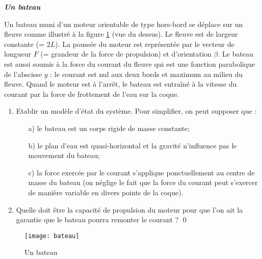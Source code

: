 \begin{exercice}{\bf \em Un bateau}

Un bateau muni d'un moteur orientable de type \og hors-bord \gf se déplace sur un fleuve comme illustré à la figure \ref{bateau} (vue du dessus). Le fleuve est de largeur constante (= 2$L$). La poussée du moteur est représentée par le vecteur de longueur $F$ (= grandeur de la force de propulsion) et d'orientation $\beta$. Le bateau est aussi soumis à la force du courant du fleuve qui est une fonction parabolique de l'abscisse $y$ : le courant est nul aux deux bords et maximum au milieu du fleuve. Quand le moteur est à l'arrêt, le bateau est entraîné à la vitesse du courant par la force de frottement de l'eau sur la coque. 
\begin{enumerate}
\item Etablir un modèle d'état du système. Pour simplifier, on peut supposer que :
\begin{itemize}
\item[a)] le bateau est un corps rigide de masse constante;
\item[b)] le plan d'eau est quasi-horizontal et la gravité n'influence pas le mouvement du bateau;
\item[c)] la force exercée par le courant s'applique ponctuellement au centre de masse du bateau (on néglige le fait que la force du courant peut s'exercer de manière variable en divers points de la coque).
\end{itemize}
\item Quelle doit être la capacité de propulsion du moteur pour que l'on ait la garantie que le bateau pourra remonter le courant ? \qed
\end{enumerate} 
\begin{figure}[h]
\begin{center}
\texttt{[image: bateau]}
\caption{Un bateau}
\label{bateau}
\end{center}
\end{figure}
\end{exercice}
\vv




